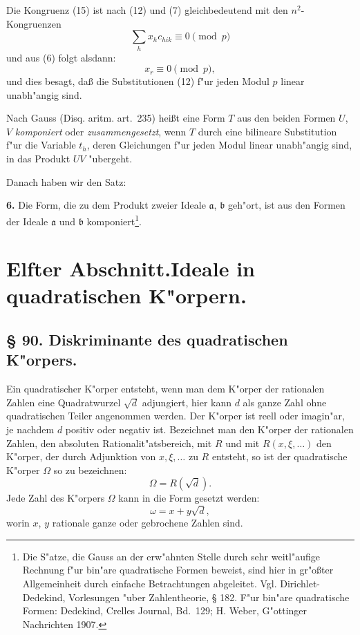 \documentclass[12pt,a4paper]{article}
\theoremstyle{plain}
\begin{document}
Die Kongruenz (15) ist nach (12) und (7) gleichbedeutend mit den $n^2$-Kongruenzen
\[
\sum_h x_h c_{hik} \equiv 0 \pmod{p}
\]
und aus (6) folgt alsdann:
\[
x_r \equiv 0 \pmod{p},
\]
und dies besagt, da\ss{} die Substitutionen (12) f"ur jeden Modul $p$ linear unabh"angig sind.

Nach Gauss (Disq. aritm. art.~235) hei\ss t eine Form $T$ aus den beiden Formen $U$, $V$ \textit{komponiert} oder \textit{zusammengesetzt}, wenn $T$ durch eine bilineare Substitution f"ur die Variable $t_h$, deren Gleichungen f"ur jeden Modul linear unabh"angig sind, in das Produkt $UV$ "ubergeht.

Danach haben wir den Satz:

\textbf{6.} Die Form, die zu dem Produkt zweier Ideale $\mathfrak{a}$, $\mathfrak{b}$ geh"ort, ist aus den Formen der Ideale $\mathfrak{a}$ und $\mathfrak{b}$ komponiert\footnote{Die S"atze, die Gauss an der erw"ahnten Stelle durch sehr weitl"aufige Rechnung f"ur bin"are quadratische Formen beweist, sind hier in gr"o\ss ter Allgemeinheit durch einfache Betrachtungen abgeleitet. Vgl. Dirichlet-Dedekind, Vorlesungen "uber Zahlentheorie, \S{} 182. F"ur bin"are quadratische Formen: Dedekind, Crelles Journal, Bd.~129; H. Weber, G"ottinger Nachrichten 1907.}.

\newpage
\section*{Elfter Abschnitt.\quad Ideale in quadratischen K"orpern.}

\subsection*{\S{} 90. Diskriminante des quadratischen K"orpers.}

Ein quadratischer K"orper entsteht, wenn man dem K"orper der rationalen Zahlen eine Quadratwurzel $\sqrt{d}$ adjungiert, hier kann $d$ als ganze Zahl ohne quadratischen Teiler angenommen werden. Der K"orper ist reell oder imagin"ar, je nachdem $d$ positiv oder negativ ist. Bezeichnet man den K"orper der rationalen Zahlen, den absoluten Rationalit"atsbereich, mit $R$ und mit $R(x, \xi, \ldots)$ den K"orper, der durch Adjunktion von $x, \xi, \ldots$ zu $R$ entsteht, so ist der quadratische K"orper $\Omega$ so zu bezeichnen:
\begin{equation}
\Omega = R(\sqrt{d}).
\tag{1}
\end{equation}
Jede Zahl des K"orpers $\Omega$ kann in die Form gesetzt werden:
\begin{equation}
\omega = x + y\sqrt{d},
\tag{2}
\end{equation}
worin $x$, $y$ rationale ganze oder gebrochene Zahlen sind.
\end{document}
